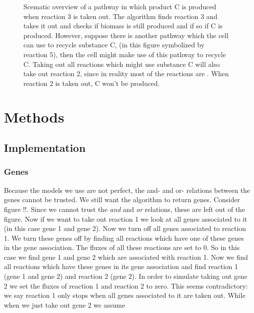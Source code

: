 \documentclass[12pt]{report}
\begin{document}
\begin{figure}[hbtp]
  \centering
     
      \caption{Scematic overview of a pathway in which product C is produced when reaction 3 is taken out. The algorithm finds reaction 3 and takes it out and checks if biomass is still produced and if so if C is produced. However, suppose there is another pathway which the cell can use to recycle substance C, (in this figure symbolized by reaction 5), then the cell might make use of this pathway to recycle C. Taking out all reactions which might use substance C will also take out reaction 2, since in reality most of the reactions are . When reaction 2 is taken out, C won't be produced.}
  \label{fig:reaction-overview}
\end{figure}



\section{Methods}
\subsection{Implementation}
\subsubsection{Genes}
Because the models we use are not perfect, the and- and or- relations between the genes cannot be trusted.
We still want the algorithm to return genes. Consider figure !!. Since we cannot trust the \emph{and} and \emph{or} relations, these are left out of the figure. Now if we want to take out reaction 1 we look at all genes associated to it (in this case gene 1 and gene 2). Now we turn off all genes associated to reaction 1. We turn these genes off by finding all reactions which have one of these genes in the gene association. The fluxes of all these reactions are set to 0. So in this case we find gene 1 and gene 2 which are associated with reaction 1. Now we find all reactions which have these genes in its gene association and find reaction 1 (gene 1 and gene 2) and reaction 2 (gene 2). In order to simulate taking out gene 2 we set the fluxes of reaction 1 and reaction 2 to zero. This seems contradictory: we say reaction 1 only stops when all genes associated to it are taken out. While when we just take out gene 2 we assume  
\end{document}
